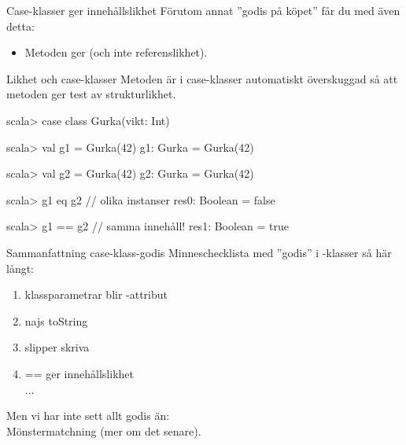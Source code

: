

\begin{Slide}{Case-klasser ger innehållslikhet}
Förutom annat ''godis på köpet'' får du med  även detta:
\begin{itemize}
\item Metoden \code{==} ger  (och inte referenslikhet).
\end{itemize}
\end{Slide}



\begin{Slide}{Likhet och case-klasser}
Metoden  är i case-klasser automatiskt överskuggad så att metoden \code{==} ger test av strukturlikhet.
\begin{REPL}
scala> case class Gurka(vikt: Int)

scala> val g1 = Gurka(42)
g1: Gurka = Gurka(42)

scala> val g2 = Gurka(42)
g2: Gurka = Gurka(42)

scala> g1 eq g2          // olika instanser
res0: Boolean = false

scala> g1 == g2          // samma innehåll!
res1: Boolean = true
\end{REPL}
\end{Slide}



\begin{Slide}{Sammanfattning case-klass-godis}
Minneschecklista med ''godis'' i -klasser så här långt:
\begin{enumerate}
\item klassparametrar blir -attribut
\item najs toString
\item slipper skriva 
\item == ger innehållslikhet 
\pause~\\...
\end{enumerate}

\vspace{1em}Men vi har inte sett allt godis än: \\Mönstermatchning (mer om det senare).
\end{Slide}
